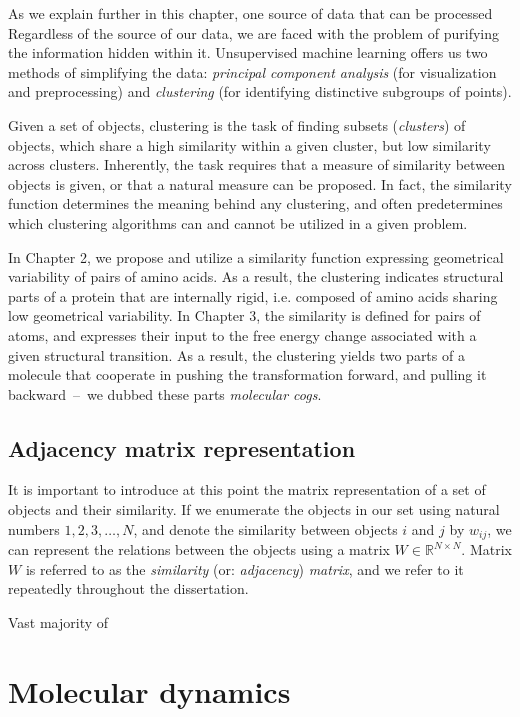 \documentclass[a4paper,11pt,twoside]{book}%
\begin{document}
As we explain further in this chapter, one source of data that can be processed  
Regardless of the source of our data, we are faced with the problem of purifying the information hidden within it.
Unsupervised machine learning offers us two methods of simplifying the data: \emph{principal component analysis} (for visualization and preprocessing) and \emph{clustering} (for identifying distinctive subgroups of points).

Given a set of objects, clustering is the task of finding subsets (\emph{clusters}) of objects, which share a high similarity within a given cluster, but low similarity across clusters.
Inherently, the task requires that a measure of similarity between objects is given, or that a natural measure can be proposed.
In fact, the similarity function determines the meaning behind any clustering, and often predetermines which clustering algorithms can and cannot be utilized in a given problem.

In Chapter 2, we propose and utilize a similarity function expressing geometrical variability of pairs of amino acids.
As a result, the clustering indicates structural parts of a protein that are internally rigid, i.e. composed of amino acids sharing low geometrical variability.
In Chapter 3, the similarity is defined for pairs of atoms, and expresses their input to the free energy change associated with a given structural transition.
As a result, the clustering yields two parts of a molecule that cooperate in pushing the transformation forward, and pulling it backward~--~we dubbed these parts \emph{molecular cogs}. 

\subsection{Adjacency matrix representation}\label{sec:matrixRepresentation}

It is important to introduce at this point the matrix representation of a set of objects and their similarity.
If we enumerate the objects in our set using natural numbers $1,2,3,\ldots,N$, and denote the similarity between objects $i$ and $j$ by $w_{ij}$, we can represent the relations between the objects using a matrix $W\in\mathbb{R}^{N\times N}$.
Matrix $W$ is referred to as the \emph{similarity} (or: \emph{adjacency}) \emph{matrix}, and we refer to it repeatedly throughout the dissertation.

Vast majority of 

\section{Molecular dynamics}
\end{document}
